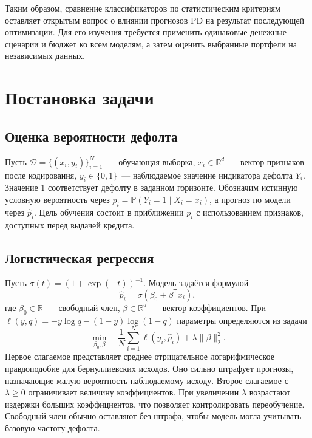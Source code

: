 \documentclass{misisarticle}
\begin{document}
Таким образом, сравнение классификаторов по статистическим критериям оставляет открытым вопрос о влиянии прогнозов PD на результат последующей оптимизации. Для его изучения требуется применить одинаковые денежные сценарии и бюджет ко всем моделям, а затем оценить выбранные портфели на независимых данных.

\section{Постановка задачи}

\subsection{Оценка вероятности дефолта}

Пусть $\mathcal D=\{(x_i,y_i)\}_{i=1}^{N}$~--- обучающая выборка, $x_i\in\mathbb R^d$~--- вектор признаков после кодирования, $y_i\in\{0,1\}$~--- наблюдаемое значение индикатора дефолта $Y_i$. Значение $1$ соответствует дефолту в заданном горизонте. Обозначим истинную условную вероятность через $p_i=\mathbb P(Y_i=1\mid X_i=x_i)$, а прогноз по модели через $\hat p_i$. Цель обучения состоит в приближении $p_i$ с использованием признаков, доступных перед выдачей кредита.

\subsection{Логистическая регрессия}

Пусть $\sigma(t)=(1+\exp(-t))^{-1}$. Модель задаётся формулой
\begin{equation}
  \hat p_i=\sigma(\beta_0+\beta^\mathsf{T}x_i),
  \label{eq:logit}
\end{equation}
где $\beta_0\in\mathbb R$~--- свободный член, $\beta\in\mathbb R^d$~--- вектор коэффициентов. При $\ell(y,q)=-y\log q-(1-y)\log(1-q)$ параметры определяются из задачи
\begin{equation}
  \min_{\beta_0,\beta}\quad
  \frac{1}{N}\sum_{i=1}^N\ell(y_i,\hat p_i)
       +\lambda\|\beta\|_2^2 .
  \label{eq:training}
\end{equation}
Первое слагаемое представляет среднее отрицательное логарифмическое правдоподобие для бернуллиевских исходов. Оно сильно штрафует прогнозы, назначающие малую вероятность наблюдаемому исходу. Второе слагаемое с $\lambda\geq 0$ ограничивает величину коэффициентов. При увеличении $\lambda$ возрастают издержки больших коэффициентов, что позволяет контролировать переобучение. Свободный член обычно оставляют без штрафа, чтобы модель могла учитывать базовую частоту дефолта.
\end{document}
